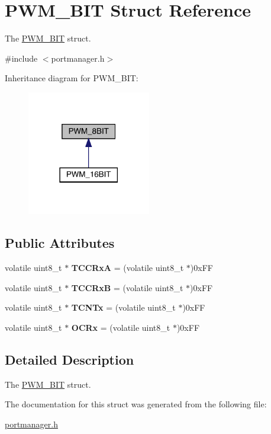 \hypertarget{structPWM__8BIT}{}\section{P\+W\+M\+\_\+B\+IT Struct Reference}
\label{structPWM__8BIT}


The \hyperlink{structPWM__8BIT}{P\+W\+M\+\_\+B\+IT} struct.  




{\ttfamily \#include $<$portmanager.\+h$>$}



Inheritance diagram for P\+W\+M\+\_\+B\+IT\+:\nopagebreak
\begin{figure}[H]
\begin{center}
\leavevmode
\includegraphics[width=153pt]{structPWM__8BIT__inherit__graph}
\end{center}
\end{figure}
\subsection*{Public Attributes}
\begin{DoxyCompactItemize}
\item 
\mbox{\label{structPWM__8BIT_a67a66abe93d97084f94c41c4bb4264b7}} 
volatile uint8\+\_\+t $\ast$ {\bfseries T\+C\+C\+RxA} = (volatile uint8\+\_\+t $\ast$)0x\+FF
\item 
\mbox{\label{structPWM__8BIT_a9b5a0f38311b0914a5011204a0039255}} 
volatile uint8\+\_\+t $\ast$ {\bfseries T\+C\+C\+RxB} = (volatile uint8\+\_\+t $\ast$)0x\+FF
\item 
\mbox{\label{structPWM__8BIT_ad1f2062ca0b4dce0decf2282f045f56e}} 
volatile uint8\+\_\+t $\ast$ {\bfseries T\+C\+N\+Tx} = (volatile uint8\+\_\+t $\ast$)0x\+FF
\item 
\mbox{\label{structPWM__8BIT_aac6d531b2442f9217341d7c1e27aa54d}} 
volatile uint8\+\_\+t $\ast$ {\bfseries O\+C\+Rx} = (volatile uint8\+\_\+t $\ast$)0x\+FF
\end{DoxyCompactItemize}


\subsection{Detailed Description}
The \hyperlink{structPWM__8BIT}{P\+W\+M\+\_\+B\+IT} struct. 

The documentation for this struct was generated from the following file\+:\begin{DoxyCompactItemize}
\item 
\hyperlink{portmanager_8h}{portmanager.\+h}\end{DoxyCompactItemize}
